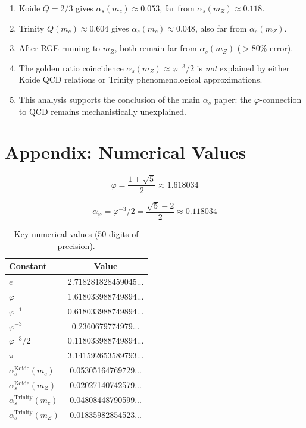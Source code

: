 \documentclass{article}
\begin{document}
\begin{table}[h]
\begin{table}[h]
\begin{enumerate}
  \item Koide $Q = 2/3$ gives $\alpha_s(m_c) \approx 0.053$, far from $\alpha_s(m_Z) \approx 0.118$.
  \item Trinity $Q(m_c) \approx 0.604$ gives $\alpha_s(m_c) \approx 0.048$, also far from $\alpha_s(m_Z)$.
  \item After RGE running to $m_Z$, both remain far from $\alpha_s(m_Z)$ ($> 80\%$ error).
  \item The golden ratio coincidence $\alpha_s(m_Z) \approx \varphi^{-3}/2$ is \emph{not} explained by either Koide QCD relations or Trinity phenomenological approximations.
  \item This analysis supports the conclusion of the main $\alpha_s$ paper: the $\varphi$-connection to QCD remains mechanistically unexplained.
\end{enumerate}

\section{Appendix: Numerical Values}

\begin{equation}
  \varphi = \frac{1 + \sqrt{5}}{2} \approx 1.618034
  \label{eq:phi}
\end{equation}

\begin{equation}
  \alpha_\varphi = \varphi^{-3}/2 = \frac{\sqrt{5} - 2}{2} \approx 0.118034
  \label{eq:alpha-phi}
\end{equation}

\begin{table}[h]
\centering
\caption{Key numerical values (50 digits of precision).}
\label{tab:numerical}
\renewcommand{\arraystretch}{1.2}
\begin{tabular}{lc}
\toprule
Constant & Value \\
\midrule
$e$ & 2.718281828459045... \\
$\varphi$ & 1.618033988749894... \\
$\varphi^{-1}$ & 0.618033988749894... \\
$\varphi^{-3}$ & 0.2360679774979... \\
$\varphi^{-3}/2$ & 0.118033988749894... \\
$\pi$ & 3.141592653589793... \\
$\alpha_s^{\text{Koide}}(m_c)$ & 0.05305164769729... \\
$\alpha_s^{\text{Koide}}(m_Z)$ & 0.02027140742579... \\
$\alpha_s^{\text{Trinity}}(m_c)$ & 0.04808448790599... \\
$\alpha_s^{\text{Trinity}}(m_Z)$ & 0.01835982854523... \\
\bottomrule
\end{tabular}


\end{table}
\end{table}
\end{table}
\end{document}
